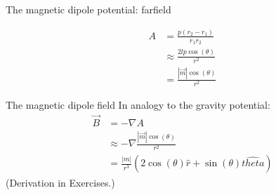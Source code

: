 \begin{frame}
  \begin{PointSix}{The magnetic dipole potential: farfield}
    \begin{align*}
      A & =  \frac{p(r_2-r_1)}{r_1r_2} \\
      &\approx \frac{2lp\cos(\theta)}{r^2} \\
      &= \frac{|\vec{m}|\cos(\theta)}{r^2}
    \end{align*}
  \end{PointSix}
\end{frame}
\begin{frame}
  \begin{PointSix}{The magnetic dipole field}
    In analogy to the gravity potential:
    \begin{align*}
      \vec{B} & = -\nabla A \\
         &\approx -\nabla \frac{|\vec{m}|\cos(\theta)}{r^2} \\
         & = \frac{|m|}{r^3}\left(2\cos(\theta)\hat{r}+\sin(\theta)\hat{theta}\right)
    \end{align*}
    \small (Derivation in Exercises.)
  \end{PointSix}
\end{frame}


